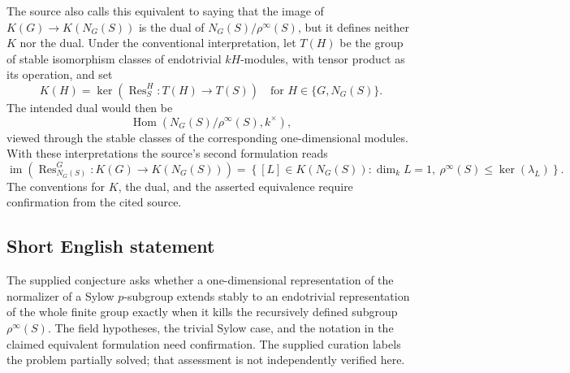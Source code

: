 \documentclass[11pt]{article}
\begin{document}
The source also calls this equivalent to saying that the image of \(K(G)\to K(N_G(S))\) is the dual of \(N_G(S)/\rho^\infty(S)\), but it defines neither \(K\) nor the dual. Under the conventional interpretation, let \(T(H)\) be the group of stable isomorphism classes of endotrivial \(kH\)-modules, with tensor product as its operation, and set
\[
K(H)=\ker\!\left(\operatorname{Res}^{H}_{S}:T(H)\longrightarrow T(S)\right)
\quad\text{for }H\in\{G,N_G(S)\}.
\]
The intended dual would then be
\[
\operatorname{Hom}\!\left(N_G(S)/\rho^\infty(S),k^\times\right),
\]
viewed through the stable classes of the corresponding one-dimensional modules. With these interpretations the source's second formulation reads
\[
\operatorname{im}\!\left(\operatorname{Res}^{G}_{N_G(S)}:K(G)\longrightarrow K(N_G(S))\right)
=
\left\{[L]\in K(N_G(S)):
\dim_k L=1,\ \rho^\infty(S)\le\ker(\lambda_L)\right\}.
\]
The conventions for \(K\), the dual, and the asserted equivalence require confirmation from the cited source.
\subsection{Short English statement}
The supplied conjecture asks whether a one-dimensional representation of the normalizer of a Sylow \(p\)-subgroup extends stably to an endotrivial representation of the whole finite group exactly when it kills the recursively defined subgroup \(\rho^\infty(S)\). The field hypotheses, the trivial Sylow case, and the notation in the claimed equivalent formulation need confirmation. The supplied curation labels the problem partially solved; that assessment is not independently verified here.
\end{document}
